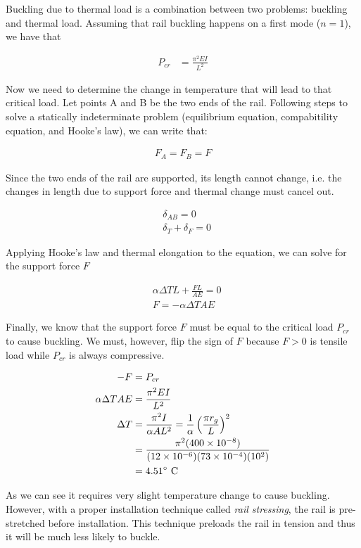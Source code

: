 \documentclass[
10pt,
a4paper,
openany,
svgnames,
]{book} %
\begin{document}
\begin{solution}

  Buckling due to thermal load is a combination between two problems: buckling and thermal load. Assuming that rail buckling happens on a first mode ($n = 1$), we have that

  \begin{align*}
    P_{cr} &= \frac{ \pi^2 EI }{ L^2 } 
  \end{align*}

  Now we need to determine the change in temperature that will lead to that critical load. Let points A and B be the two ends of the rail. Following steps to solve a statically indeterminate problem (equilibrium equation, compabitility equation, and Hooke's law), we can write that:

  \begin{align*}
    F_A = F_B = F
  \end{align*}

  Since the two ends of the rail are supported, its length cannot change, i.e. the changes in length due to support force and thermal change must cancel out.

  \begin{align*}
    &\delta_{AB} = 0 \\
    &\delta_T + \delta_F = 0
  \end{align*}

  Applying Hooke's law and thermal elongation to the equation, we can solve for the support force $F$

  \begin{align*}
    &\alpha \Delta T L + \frac {FL}{AE} = 0 \\
    &F = -\alpha \Delta T A E
  \end{align*}

  Finally, we know that the support force $F$ must be equal to the critical load $P_{cr}$ to cause buckling. We must, however, flip the sign of $F$ because $F > 0$ is tensile load while $P_{cr}$ is always compressive.

  \begin{align*}
    -F &= P_{cr} \\
    \alpha \Delta T A E &= \frac{ \pi^2 EI }{ L^2 } \\
    \Delta T &= \frac{ \pi^2 I }{ \alpha A L^2} = \frac{1}{\alpha} \left( \frac{ \pi r_g }{L} \right)^2 \\
       &= \frac{ \pi^2 (400 \times 10^{-8}) }{ (12 \times 10^{-6})(73 \times 10^{-4})(10^2)}\\
       &= 4.51\degree \text{ C}
  \end{align*}

  As we can see it requires very slight temperature change to cause buckling. However, with a proper installation technique called \emph{rail stressing}, the rail is pre-stretched before installation. This technique preloads the rail in tension and thus it will be much less likely to buckle.
\end{solution}
\end{document}

